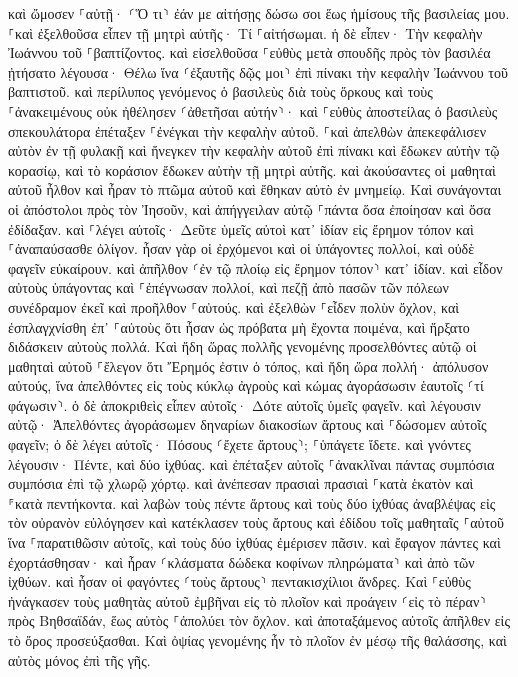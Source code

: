 \documentclass[twoside, 9pt]{extreport}
\begin{document}
καὶ ὤμοσεν ⸀αὐτῇ· ⸂Ὅ τι⸃ ἐάν με αἰτήσῃς δώσω σοι ἕως ἡμίσους τῆς βασιλείας μου. 
⸀καὶ ἐξελθοῦσα εἶπεν τῇ μητρὶ αὐτῆς· Τί ⸀αἰτήσωμαι. ἡ δὲ εἶπεν· Τὴν κεφαλὴν Ἰωάννου τοῦ ⸀βαπτίζοντος. 
καὶ εἰσελθοῦσα ⸀εὐθὺς μετὰ σπουδῆς πρὸς τὸν βασιλέα ᾐτήσατο λέγουσα· Θέλω ἵνα ⸂ἐξαυτῆς δῷς μοι⸃ ἐπὶ πίνακι τὴν κεφαλὴν Ἰωάννου τοῦ βαπτιστοῦ. 
καὶ περίλυπος γενόμενος ὁ βασιλεὺς διὰ τοὺς ὅρκους καὶ τοὺς ⸀ἀνακειμένους οὐκ ἠθέλησεν ⸂ἀθετῆσαι αὐτήν⸃· 
καὶ ⸀εὐθὺς ἀποστείλας ὁ βασιλεὺς σπεκουλάτορα ἐπέταξεν ⸀ἐνέγκαι τὴν κεφαλὴν αὐτοῦ. ⸀καὶ ἀπελθὼν ἀπεκεφάλισεν αὐτὸν ἐν τῇ φυλακῇ 
καὶ ἤνεγκεν τὴν κεφαλὴν αὐτοῦ ἐπὶ πίνακι καὶ ἔδωκεν αὐτὴν τῷ κορασίῳ, καὶ τὸ κοράσιον ἔδωκεν αὐτὴν τῇ μητρὶ αὐτῆς. 
καὶ ἀκούσαντες οἱ μαθηταὶ αὐτοῦ ἦλθον καὶ ἦραν τὸ πτῶμα αὐτοῦ καὶ ἔθηκαν αὐτὸ ἐν μνημείῳ. 
Καὶ συνάγονται οἱ ἀπόστολοι πρὸς τὸν Ἰησοῦν, καὶ ἀπήγγειλαν αὐτῷ ⸀πάντα ὅσα ἐποίησαν καὶ ὅσα ἐδίδαξαν. 
καὶ ⸀λέγει αὐτοῖς· Δεῦτε ὑμεῖς αὐτοὶ κατ᾽ ἰδίαν εἰς ἔρημον τόπον καὶ ⸀ἀναπαύσασθε ὀλίγον. ἦσαν γὰρ οἱ ἐρχόμενοι καὶ οἱ ὑπάγοντες πολλοί, καὶ οὐδὲ φαγεῖν εὐκαίρουν. 
καὶ ἀπῆλθον ⸂ἐν τῷ πλοίῳ εἰς ἔρημον τόπον⸃ κατ᾽ ἰδίαν. 
καὶ εἶδον αὐτοὺς ὑπάγοντας καὶ ⸀ἐπέγνωσαν πολλοί, καὶ πεζῇ ἀπὸ πασῶν τῶν πόλεων συνέδραμον ἐκεῖ καὶ προῆλθον ⸀αὐτούς. 
καὶ ἐξελθὼν ⸀εἶδεν πολὺν ὄχλον, καὶ ἐσπλαγχνίσθη ἐπ᾽ ⸀αὐτοὺς ὅτι ἦσαν ὡς πρόβατα μὴ ἔχοντα ποιμένα, καὶ ἤρξατο διδάσκειν αὐτοὺς πολλά. 
Καὶ ἤδη ὥρας πολλῆς γενομένης προσελθόντες αὐτῷ οἱ μαθηταὶ αὐτοῦ ⸀ἔλεγον ὅτι Ἔρημός ἐστιν ὁ τόπος, καὶ ἤδη ὥρα πολλή· 
ἀπόλυσον αὐτούς, ἵνα ἀπελθόντες εἰς τοὺς κύκλῳ ἀγροὺς καὶ κώμας ἀγοράσωσιν ἑαυτοῖς ⸂τί φάγωσιν⸃. 
ὁ δὲ ἀποκριθεὶς εἶπεν αὐτοῖς· Δότε αὐτοῖς ὑμεῖς φαγεῖν. καὶ λέγουσιν αὐτῷ· Ἀπελθόντες ἀγοράσωμεν δηναρίων διακοσίων ἄρτους καὶ ⸀δώσομεν αὐτοῖς φαγεῖν; 
ὁ δὲ λέγει αὐτοῖς· Πόσους ⸂ἔχετε ἄρτους⸃; ⸀ὑπάγετε ἴδετε. καὶ γνόντες λέγουσιν· Πέντε, καὶ δύο ἰχθύας. 
καὶ ἐπέταξεν αὐτοῖς ⸀ἀνακλῖναι πάντας συμπόσια συμπόσια ἐπὶ τῷ χλωρῷ χόρτῳ. 
καὶ ἀνέπεσαν πρασιαὶ πρασιαὶ ⸀κατὰ ἑκατὸν καὶ ⸁κατὰ πεντήκοντα. 
καὶ λαβὼν τοὺς πέντε ἄρτους καὶ τοὺς δύο ἰχθύας ἀναβλέψας εἰς τὸν οὐρανὸν εὐλόγησεν καὶ κατέκλασεν τοὺς ἄρτους καὶ ἐδίδου τοῖς μαθηταῖς ⸀αὐτοῦ ἵνα ⸀παρατιθῶσιν αὐτοῖς, καὶ τοὺς δύο ἰχθύας ἐμέρισεν πᾶσιν. 
καὶ ἔφαγον πάντες καὶ ἐχορτάσθησαν· 
καὶ ἦραν ⸂κλάσματα δώδεκα κοφίνων πληρώματα⸃ καὶ ἀπὸ τῶν ἰχθύων. 
καὶ ἦσαν οἱ φαγόντες ⸂τοὺς ἄρτους⸃ πεντακισχίλιοι ἄνδρες. 
Καὶ ⸀εὐθὺς ἠνάγκασεν τοὺς μαθητὰς αὐτοῦ ἐμβῆναι εἰς τὸ πλοῖον καὶ προάγειν ⸂εἰς τὸ πέραν⸃ πρὸς Βηθσαϊδάν, ἕως αὐτὸς ⸀ἀπολύει τὸν ὄχλον. 
καὶ ἀποταξάμενος αὐτοῖς ἀπῆλθεν εἰς τὸ ὄρος προσεύξασθαι. 
Καὶ ὀψίας γενομένης ἦν τὸ πλοῖον ἐν μέσῳ τῆς θαλάσσης, καὶ αὐτὸς μόνος ἐπὶ τῆς γῆς. 
\end{document}
